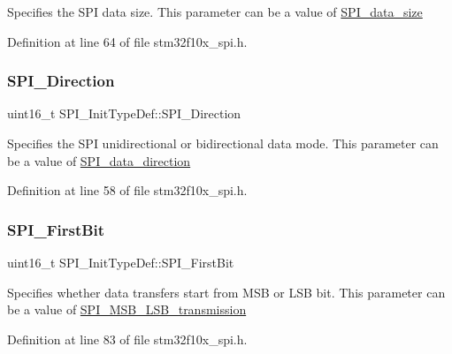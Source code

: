 Specifies the S\+PI data size. This parameter can be a value of \hyperlink{group___s_p_i__data__size}{S\+P\+I\+\_\+data\+\_\+size} 

Definition at line 64 of file stm32f10x\+\_\+spi.\+h.

\mbox{\label{struct_s_p_i___init_type_def_a8cf0fefa76b9238a41997db14eac62a9}} 
\subsubsection{\texorpdfstring{S\+P\+I\+\_\+\+Direction}{SPI\_Direction}}
{\footnotesize\ttfamily uint16\+\_\+t S\+P\+I\+\_\+\+Init\+Type\+Def\+::\+S\+P\+I\+\_\+\+Direction}

Specifies the S\+PI unidirectional or bidirectional data mode. This parameter can be a value of \hyperlink{group___s_p_i__data__direction}{S\+P\+I\+\_\+data\+\_\+direction} 

Definition at line 58 of file stm32f10x\+\_\+spi.\+h.

\mbox{\label{struct_s_p_i___init_type_def_ace7ca292c290953f8a6ae86f79949f5b}} 
\subsubsection{\texorpdfstring{S\+P\+I\+\_\+\+First\+Bit}{SPI\_FirstBit}}
{\footnotesize\ttfamily uint16\+\_\+t S\+P\+I\+\_\+\+Init\+Type\+Def\+::\+S\+P\+I\+\_\+\+First\+Bit}

Specifies whether data transfers start from M\+SB or L\+SB bit. This parameter can be a value of \hyperlink{group___s_p_i___m_s_b___l_s_b__transmission}{S\+P\+I\+\_\+\+M\+S\+B\+\_\+\+L\+S\+B\+\_\+transmission} 

Definition at line 83 of file stm32f10x\+\_\+spi.\+h.

\mbox{\label{struct_s_p_i___init_type_def_a578435d3b3a17baa5d5ff87447aa697f}} 
